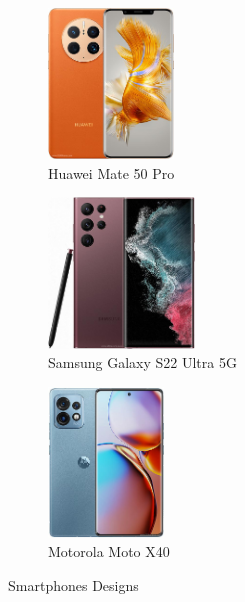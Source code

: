 \documentclass[answers, 10pt, UKenglish]{exam}
\begin{document}
\begin{figure}[htpb]
	\begin{subfigure}[htpb]{0.25\linewidth}
	\begin{center}
		\includegraphics[width=\linewidth,height=4cm,keepaspectratio]{huawei-mate-50-pro}
	\end{center}
	\caption{Huawei Mate 50 Pro}
	\label{fig:huawei-mate-50-pro}
	\end{subfigure}
	\begin{subfigure}[htpb]{0.25\linewidth}
	\begin{center}
		\includegraphics[width=\linewidth,height=4cm,keepaspectratio]{samsung-galaxy-s22-ultra-5g}
	\end{center}
	\caption{Samsung Galaxy S22 Ultra 5G}
	\label{fig:samsung-galaxy-s22-ultra-5g}
	\end{subfigure}
	\begin{subfigure}[htpb]{0.25\linewidth}
	\begin{center}
		\includegraphics[width=\linewidth,height=4cm,keepaspectratio]{motorola-moto-x40}
	\end{center}
	\caption{Motorola Moto X40}
	\label{fig:motorola-moto-x40}
	\end{subfigure}
	
	\caption{Smartphones Designs}
	\label{fig:smartphones-design}
\end{figure}
\end{document}
